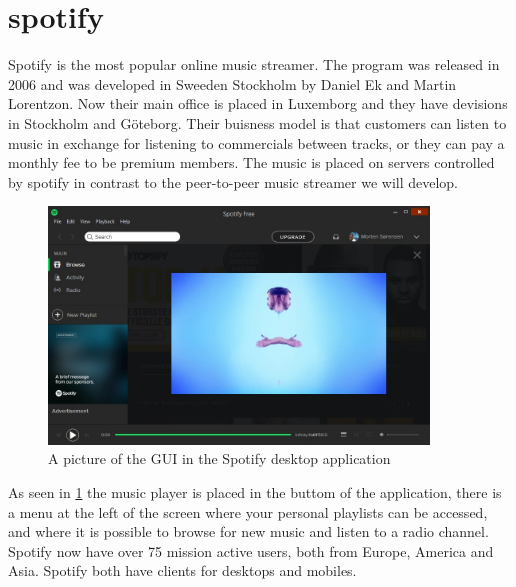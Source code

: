 \section{spotify}
Spotify is the most popular online music streamer. The program was released in 2006 and was developed in Sweeden Stockholm by Daniel Ek and Martin Lorentzon. Now their main office is placed in Luxemborg and they have devisions in Stockholm and Göteborg. Their buisness model is that customers can listen to music in exchange for listening to commercials between tracks, or they can pay a monthly fee to be premium members.
The music is placed on servers controlled by spotify in contrast to the peer-to-peer music streamer we will develop.
\begin{figure}[p]
  \centering
    \includegraphics[width=0.9\textwidth]{gfx/Spotify_desktop.jpg}
  \caption{A picture of the GUI in the Spotify desktop application}
  \label{fig:spotify}
\end{figure}
As seen in \ref{fig:spotify} the music player is placed in the buttom of the application, there is a menu at the left of the screen where your personal playlists can be accessed, and where it is possible to browse for new music and listen to a radio channel.
Spotify now have over 75 mission active users, both from Europe, America and Asia. Spotify both have clients for desktops and mobiles.

